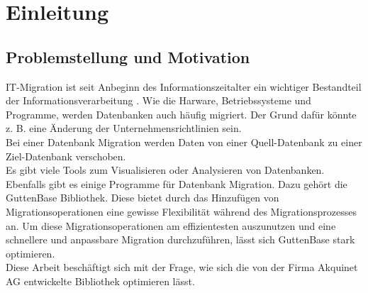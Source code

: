 \chapter{Einleitung}

\section{Problemstellung und Motivation}


IT-Migration ist seit Anbeginn des Informationszeitalter ein wichtiger Bestandteil der Informationsverarbeitung \cite{wachter2015systemkonsolidierung}. Wie die Harware, Betriebssysteme und Programme, werden Datenbanken auch häufig migriert. Der Grund dafür könnte z. B. eine Änderung der Unternehmensrichtlinien sein. \\ 
Bei einer Datenbank Migration werden Daten von einer Quell-Datenbank zu einer Ziel-Datenbank verschoben. \\
Es gibt viele Tools zum Visualisieren oder Analysieren von  Datenbanken. Ebenfalls gibt es einige Programme für Datenbank Migration. Dazu gehört die GuttenBase Bibliothek. Diese bietet durch das Hinzufügen von Migrationsoperationen eine gewisse Flexibilität während des Migrationsprozesses an. Um diese Migrationsoperationen am effizientesten auszunutzen und eine schnellere und anpassbare Migration durchzuführen, lässt sich GuttenBase stark optimieren. \\Diese Arbeit beschäftigt sich mit der Frage, wie sich die von der Firma Akquinet AG entwickelte Bibliothek optimieren lässt.
